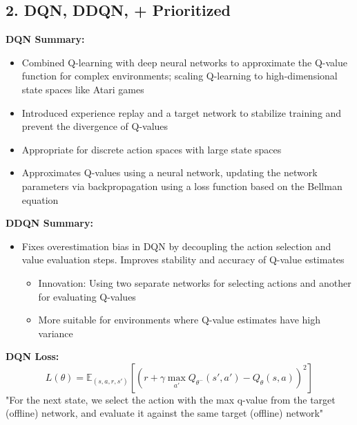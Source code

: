 \documentclass[a4paper,10pt]{article}
\begin{document}
\begin{multicols}{2}
\section*{2. DQN, DDQN, + Prioritized}
\textbf{DQN Summary:}
\begin{itemize}
    \item Combined Q-learning with deep neural networks to approximate the Q-value function for complex environments; scaling Q-learning to high-dimensional state spaces like Atari games
    \item Introduced experience replay and a target network to stabilize training and prevent the divergence of Q-values
    \item Appropriate for discrete action spaces with large state spaces
    \item Approximates Q-values using a neural network, updating the network parameters via backpropagation using a loss function based on the Bellman equation
\end{itemize}

\noindent \textbf{DDQN Summary:}
\begin{itemize}
    \item Fixes overestimation bias in DQN by decoupling the action selection and value evaluation steps. Improves stability and accuracy of Q-value estimates
    \begin{itemize}
        \item Innovation: Using two separate networks for selecting actions and another for evaluating Q-values
        \item More suitable for environments where Q-value estimates have high variance
    \end{itemize}
\end{itemize}


\noindent \textbf{DQN Loss:}
\[
L(\theta) = \mathbb{E}_{(s, a, r, s')} \left[ \left( r + \gamma \max_{a'} Q_{\theta^-}(s', a') - Q_\theta(s, a) \right)^2 \right]
\]
"For the next state, we select the action with the max q-value from the target (offline) network, and evaluate it against the same target (offline) network"


\end{multicols}
\end{document}
